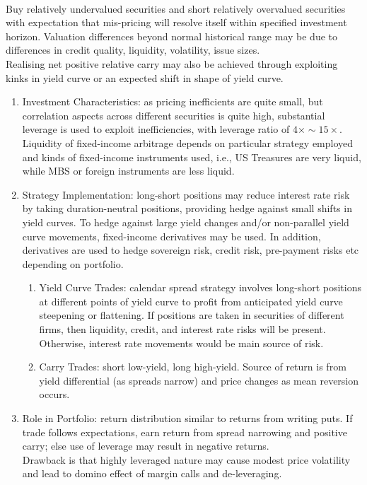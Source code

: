 \begin{remark} \\
Buy relatively undervalued securities and short relatively overvalued securities with expectation that mis-pricing will resolve itself within specified investment horizon. Valuation differences beyond normal historical range may be due to differences in credit quality, liquidity, volatility, issue sizes.\\
Realising net positive relative carry may also be achieved through exploiting kinks in yield curve or an expected shift in shape of yield curve.
\begin{enumerate}[label=\roman*.]
\setlength{\itemsep}{0pt}
\item Investment Characteristics: as pricing inefficients are quite small, but correlation aspects across different securities is quite high, substantial leverage is used to exploit inefficiencies, with leverage ratio of $4 \times \sim 15 \times$.\\
Liquidity of fixed-income arbitrage depends on particular strategy employed and kinds of fixed-income instruments used, i.e., US Treasures are very liquid, while MBS or foreign instruments are less liquid.
\item Strategy Implementation: long-short positions may reduce interest rate risk by taking duration-neutral positions, providing hedge against small shifts in yield curves. To hedge against large yield changes and/or non-parallel yield curve movements, fixed-income derivatives may be used. In addition, derivatives are used to hedge sovereign risk, credit risk, pre-payment risks etc depending on portfolio.
\begin{enumerate}[label=\arabic*.]
\setlength{\itemsep}{0pt}
\item Yield Curve Trades: calendar spread strategy involves long-short positions at different points of yield curve to profit from anticipated yield curve steepening or flattening. If positions are taken in securities of different firms, then liquidity, credit, and interest rate risks will be present. Otherwise, interest rate movements would be main source of risk.
\item Carry Trades: short low-yield, long high-yield. Source of return is from yield differential (as spreads narrow) and price changes as mean reversion occurs.
\end{enumerate}
\item Role in Portfolio: return distribution similar to returns from writing puts. If trade follows expectations, earn return from spread narrowing and positive carry; else use of leverage may result in negative returns.\\
Drawback is that highly leveraged nature may cause modest price volatility and lead to domino effect of margin calls and de-leveraging.
\end{enumerate}
\end{remark}

